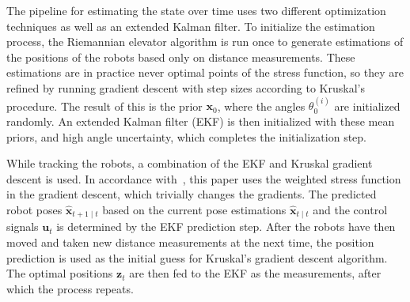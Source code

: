 The pipeline for estimating the state over time uses two different optimization techniques as well as an extended Kalman filter. To initialize the estimation process, the Riemannian elevator algorithm is run once to generate estimations of the positions of the robots based only on distance measurements. These estimations are in practice never optimal points of the stress function, so they are refined by running gradient descent with step sizes according to Kruskal's procedure. The result of this is the prior $\mathbf{x}_0$, where the angles $\theta_0^{(i)}$ are initialized randomly. An extended Kalman filter (EKF) is then initialized with these mean priors, and high angle uncertainty, which completes the initialization step. 

While tracking the robots, a combination of the EKF and Kruskal gradient descent is used. In accordance with~\cite{R_elevator}, this paper uses the weighted stress function in the gradient descent, which trivially changes the gradients. The predicted robot poses $\hat{\mathbf{x}}_{t+1 \mid t}$ based on the current pose estimations $\hat{\mathbf{x}}_{t \mid t}$ and the control signals $\mathbf{u}_t$ is determined by the EKF prediction step. After the robots have then moved and taken new distance measurements at the next time, the position prediction is used as the initial guess for Kruskal's gradient descent algorithm. The optimal positions $\mathbf{z}_t$ are then fed to the EKF as the measurements, after which the process repeats. 

